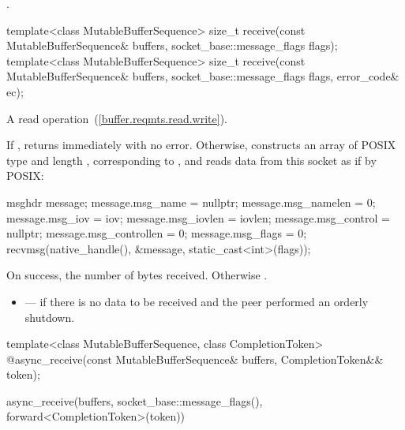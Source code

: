 \begin{itemdescr}
\pnum
\returns {}.
\end{itemdescr}

\begin{itemdecl}
template<class MutableBufferSequence>
  size_t receive(const MutableBufferSequence& buffers,
                 socket_base::message_flags flags);
template<class MutableBufferSequence>
  size_t receive(const MutableBufferSequence& buffers,
                 socket_base::message_flags flags, error_code& ec);
\end{itemdecl}

\begin{itemdescr}
\pnum
A read operation~(\ref{buffer.reqmts.read.write}).

\pnum
\effects If , returns immediately with no error. Otherwise, constructs an array  of POSIX type  and length , corresponding to , and reads data from this socket as if by POSIX:
\begin{codeblock}
msghdr message;
message.msg_name = nullptr;
message.msg_namelen = 0;
message.msg_iov = iov;
message.msg_iovlen = iovlen;
message.msg_control = nullptr;
message.msg_controllen = 0;
message.msg_flags = 0;
recvmsg(native_handle(), &message, static_cast<int>(flags));
\end{codeblock}


\pnum
\returns On success, the number of bytes received. Otherwise .

\pnum
\errors
\begin{itemize}
\item
{} --- if there is no data to be received and the peer performed an orderly shutdown.
\end{itemize}
\end{itemdescr}

\begin{itemdecl}
template<class MutableBufferSequence, class CompletionToken>
  @\DEDUCED@ async_receive(const MutableBufferSequence& buffers,
                        CompletionToken&& token);
\end{itemdecl}

\begin{itemdescr}
\pnum
\returns
\begin{codeblock}
async_receive(buffers, socket_base::message_flags(), forward<CompletionToken>(token))
\end{codeblock}
\end{itemdescr}

